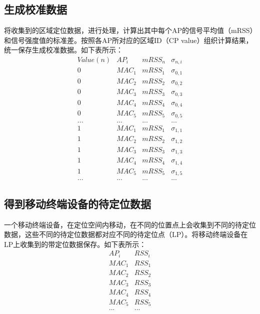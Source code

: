 \documentclass[a4paper, UTF8, twocolumn ]{ctexart}
\begin{document}
\subsection{生成校准数据}
将收集到的区域定位数据，进行处理，计算出其中每个AP的信号平均值（mRSS）和信号强度值的标准差。按照各AP所对应的区域ID（CP value）组织计算结果，统一保存生成校准数据。如下表所示：
\begin{equation}
  \begin{array}{c|c|c|c}
    Value(n) & AP_{i} & mRSS_{n} & \sigma_{n,i} \\
    \hline
    0 & MAC_{1} & mRSS_{1} & \sigma_{0,1} \\
    0 & MAC_{2} & mRSS_{2} & \sigma_{0,2} \\
    0 & MAC_{3} & mRSS_{3} & \sigma_{0,3} \\
    0 & MAC_{4} & mRSS_{4} & \sigma_{0,4} \\
    0 & MAC_{5} & mRSS_{5} & \sigma_{0,5} \\
    ... & ... & ... & ...\\
    1 & MAC_{1} & mRSS_{1} & \sigma_{1,1} \\
    1 & MAC_{2} & mRSS_{2} & \sigma_{1,2} \\
    1 & MAC_{3} & mRSS_{3} & \sigma_{1,3} \\
    1 & MAC_{4} & mRSS_{4} & \sigma_{1,4} \\
    1 & MAC_{5} & mRSS_{5} & \sigma_{1,5} \\
    ... & ... & ... & ...
  \end{array}
\end{equation}
\subsection{得到移动终端设备的待定位数据}
一个移动终端设备，在定位空间内移动，在不同的位置点上会收集到不同的待定位数据，这些不同的待定位数据都对应不同的待定位点（LP）。将移动终端设备在LP上收集到的带定位数据保存。如下表所示：
\begin{equation}
  \begin{array}{c|c}
    AP_{i} & RSS_{i}\\
    \hline
    MAC_{1} & RSS_{1}\\
    MAC_{2} & RSS_{2}\\
    MAC_{3} & RSS_{3}\\
    MAC_{4} & RSS_{4}\\
    MAC_{5} & RSS_{5}\\
    ... & ...
  \end{array}
\end{equation}
\end{document}
